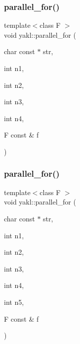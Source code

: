 \subsubsection{\texorpdfstring{parallel\+\_\+for()}{parallel\_for()}\hspace{0.1cm}{\footnotesize\ttfamily [12/16]}}
{\footnotesize\ttfamily template$<$class F $>$ \\
void yakl\+::parallel\+\_\+for (\begin{DoxyParamCaption}\item[{char const $\ast$}]{str,  }\item[{int}]{n1,  }\item[{int}]{n2,  }\item[{int}]{n3,  }\item[{int}]{n4,  }\item[{F const \&}]{f }\end{DoxyParamCaption})\hspace{0.3cm}{\ttfamily [inline]}}

\mbox{\label{namespaceyakl_ab83fda59ab02bb8c21be357843e79bf6}} 
\subsubsection{\texorpdfstring{parallel\+\_\+for()}{parallel\_for()}\hspace{0.1cm}{\footnotesize\ttfamily [13/16]}}
{\footnotesize\ttfamily template$<$class F $>$ \\
void yakl\+::parallel\+\_\+for (\begin{DoxyParamCaption}\item[{char const $\ast$}]{str,  }\item[{int}]{n1,  }\item[{int}]{n2,  }\item[{int}]{n3,  }\item[{int}]{n4,  }\item[{int}]{n5,  }\item[{F const \&}]{f }\end{DoxyParamCaption})\hspace{0.3cm}{\ttfamily [inline]}}

\mbox{\label{namespaceyakl_a2632b4726d73fe995e7cd7c287881379}} 
